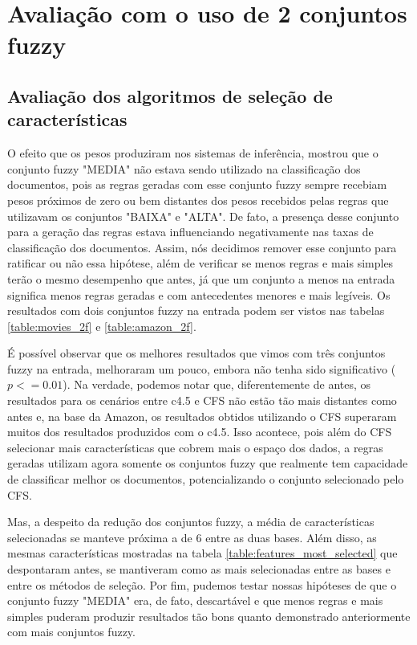 \documentclass[template.tex]{subfiles}
\begin{document}
\section{Avaliação com o uso de 2 conjuntos fuzzy}
\subsection{Avaliação dos algoritmos de seleção de características}

O efeito que os pesos produziram nos sistemas de inferência, mostrou que o conjunto fuzzy "MEDIA" não estava sendo utilizado na classificação dos documentos, pois as regras geradas com esse conjunto fuzzy sempre recebiam pesos próximos de zero ou bem distantes dos pesos recebidos pelas regras que utilizavam os conjuntos "BAIXA" e "ALTA". De fato, a presença desse conjunto para a geração das regras estava influenciando negativamente nas taxas de classificação dos documentos. Assim, nós decidimos remover esse conjunto para ratificar ou não essa hipótese, além de verificar se menos regras e mais simples terão o mesmo desempenho que antes, já que um conjunto a menos na entrada significa menos regras geradas e com antecedentes menores e mais legíveis. Os resultados com dois conjuntos fuzzy na entrada podem ser vistos nas tabelas \ref{table:movies_2f} e \ref{table:amazon_2f}.

É possível observar que os melhores resultados que vimos com três conjuntos fuzzy na entrada, melhoraram um pouco, embora não tenha sido significativo ($p <= 0.01$). Na verdade, podemos notar que, diferentemente de antes, os resultados para os cenários entre c4.5 e CFS não estão tão mais distantes como antes e, na base da Amazon, os resultados obtidos utilizando o CFS superaram muitos dos resultados produzidos com o c4.5. Isso acontece, pois além do CFS selecionar mais características que cobrem mais o espaço dos dados, a regras geradas utilizam agora somente os conjuntos fuzzy que realmente tem capacidade de classificar melhor os documentos, potencializando o conjunto selecionado pelo CFS. 

Mas, a despeito da redução dos conjuntos fuzzy, a média de características selecionadas se manteve próxima a de 6 entre as duas bases. Além disso, as mesmas características mostradas na tabela \ref{table:features_most_selected} que despontaram antes, se mantiveram como as mais selecionadas entre as bases e entre os métodos de seleção. Por fim, pudemos testar nossas hipóteses de que o conjunto fuzzy "MEDIA" era, de fato, descartável e que menos regras e mais simples puderam produzir resultados tão bons quanto demonstrado anteriormente com mais conjuntos fuzzy.
\end{document}
